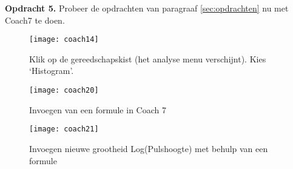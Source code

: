 \textbf{Opdracht 5.}
Probeer de opdrachten van paragraaf \ref{sec:opdrachten} nu met Coach7 te doen.

\begin{figure}
    \centering
    \texttt{[image: coach14]}
    \caption{Klik op de gereedschapskist (het analyse menu verschijnt). Kies `Histogram'.}
    \label{fig:coach14}
\end{figure}

\begin{figure}
    \centering
    \texttt{[image: coach20]}
    \caption{Invoegen van een formule in Coach 7}
    \label{fig:coach20}
\end{figure}

\begin{figure}
    \centering
    \texttt{[image: coach21]}
    \caption{Invoegen nieuwe grootheid Log(Pulshoogte) met behulp van een
    formule}
    \label{fig:coach21}
\end{figure}

